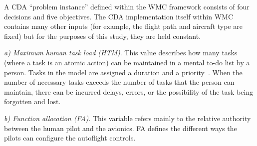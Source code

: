 \documentclass[journal]{IEEEtran}
\newenvironment{changed}{\par}{\par}
\begin{document}
A CDA ``problem instance'' defined within the WMC framework consists of four decisions and five objectives.  
The CDA implementation itself within WMC contains many other inputs (for example, the flight path and aircraft type are fixed) but for the purposes of this study, they are held constant. 



{\em a) Maximum human task load (HTM)}.
This value describes how many tasks (where a task is an atomic action) can be maintained in a mental to-do list by a person.  Tasks in the model are assigned a duration and a priority~\cite{Kim2011}. When the number of necessary tasks exceeds the number of tasks that the person can maintain, there can be incurred delays, errors, or the possibility of the task being forgotten and lost.

{\em b) Function allocation (FA)}.  This variable refers mainly to the relative authority between the human pilot and the avionics. FA defines the different
ways the pilots can configure the autoflight controls.
\end{document}
